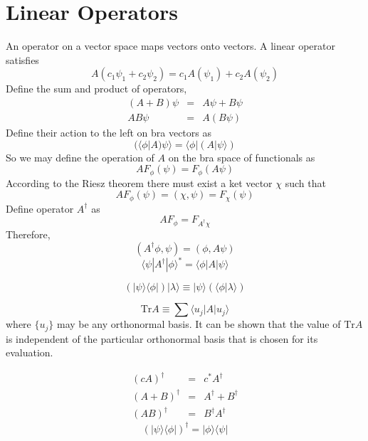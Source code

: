 \section{Linear Operators}
\begin{newdef}
An operator on a vector space maps vectors onto vectors.
A linear operator satisfies
\[A (c_1 \psi_1 + c_2 \psi_2) = c_1 A(\psi_1) + c_2 A(\psi_2)\]
Define the sum and product of operators,
\begin{eqnarray}
(A+B)\psi &=& A\psi + B\psi \nonumber \\
A B \psi &=& A (B\psi) \nonumber
\end{eqnarray}
Define their action to the left on bra vectors as
\[(\langle \phi | A ) \psi \rangle = \langle \phi | ( A | \psi \rangle )\]
So we may define the operation of $A$ on the bra space of functionals as
\[A F_{\phi} (\psi) = F_{\phi}(A\psi)\]
According to the Riesz theorem there must exist a ket vector $\chi$ such that
\[AF_{\phi}(\psi) = (\chi, \psi) = F_{\chi}(\psi)\]
Define operator $A^{\dagger}$ as
\[AF_{\phi} = F_{A^{\dagger}\chi}\]
Therefore,
\[(A^{\dagger}\phi, \psi) = (\phi, A\psi)\]
\[\langle \psi | A^{\dagger} | \phi \rangle ^* = \langle \phi | A | \psi \rangle\]
\end{newdef}

\begin{newdef}
\[(| \psi \rangle \langle \phi |) | \lambda \rangle \equiv | \psi \rangle (\langle \phi | \lambda \rangle)\]
\end{newdef}

\begin{newdef}[Trace]
\[ \mathrm{Tr} A \equiv \sum \langle u_j | A | u_j \rangle \]
where $\{ u_j \}$ may be any orthonormal basis. It can be shown that the value of $\mathrm{Tr}A$ is independent of the particular orthonormal basis that is chosen for its evaluation.
\end{newdef}

\begin{newprop}
\begin{eqnarray}
(cA)^{\dagger} &=& c^* A^{\dagger} \nonumber \\
(A + B)^{\dagger} &=& A^{\dagger} + B^{\dagger} \nonumber \\
(AB)^{\dagger} &=& B^{\dagger}  A^{\dagger} \nonumber
\end{eqnarray}
\[(| \psi \rangle \langle \phi |) ^ {\dagger} = | \phi \rangle \langle \psi |\]
\end{newprop}

